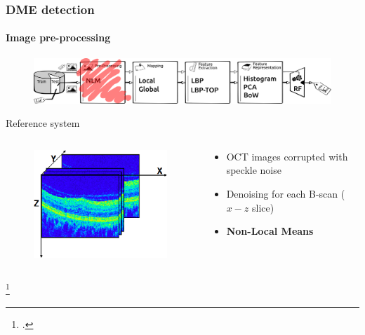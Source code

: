 \documentclass{beamer}
\begin{document}
\begin{frame}
  \frametitle{DME detection}
  \framesubtitle{Image pre-processing}
  \begin{figure}
    \centering
    \includegraphics[width=.5\textwidth]{./images/ml-nlm.png}
  \end{figure}
  \begin{block}{Reference system}
    \begin{columns}
      \begin{column}{.3\linewidth}
        \begin{figure}
          \centering
          \includegraphics[width=.6\textwidth]{./images/volume.png}
        \end{figure}
      \end{column}
      \begin{column}{.6\linewidth}
        \begin{itemize}[leftmargin=*]\footnotesize
        \item OCT images corrupted with speckle noise
        \item Denoising for each B-scan ($x-z$ slice)
        \item \textbf{Non-Local Means}~\footnotemark
        \end{itemize}
      \end{column}
    \end{columns}
  \end{block}
  \footcitetext{Coupe2009}
\end{frame}
\end{document}
